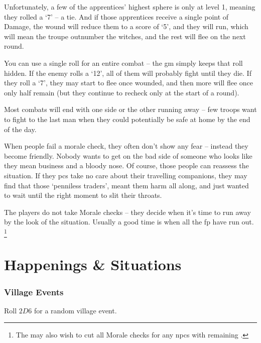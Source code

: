 \begin{multicols}{2}
\begin{exampletext}
  Unfortunately, a few of the apprentices' highest sphere is only at level 1, meaning they rolled a `7' -- a tie.
  And if those apprentices receive a single point of Damage, the wound will reduce them to a score of `5', and they will run, which will mean the troupe outnumber the witches, and the rest will flee on the next round.
\end{exampletext}

You can use a single roll for an entire combat -- the \gls{gm} simply keeps that roll hidden.
If the enemy rolls a `12', all of them will probably fight until they die.
If they roll a `7', they may start to flee once wounded, and then more will flee once only half remain (but they continue to recheck only at the start of a round).

Most combats will end with one side or the other running away -- few troops want to fight to the last man when they could potentially be safe at home by the end of the day.

When people fail a morale check, they often don't show any fear -- instead they become friendly.
Nobody wants to get on the bad side of someone who looks like they mean business and a bloody nose.
Of course, those people can reassess the situation.
If they \glspl{pc} take no care about their travelling companions, they may find that those `penniless traders', meant them harm all along, and just wanted to wait until the right moment to slit their throats.

The players do not take Morale checks -- they decide when it's time to run away by the look of the situation.
Usually a good time is when all the \gls{fp} have run out.
\footnote{The  may also wish to cut all Morale checks for any \glspl{npc} with remaining .}

\moralechart

\end{multicols}

\section{Happenings \& Situations}

\begin{multicols}{2}

\subsubsection{Village Events}

Roll $2D6$ for a random village event.

\encVillageEvent

\end{multicols}

